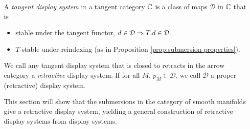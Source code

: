 \begin{definition}\label{def:display-system}
    A \emph{tangent display system} in a tangent category $\mathbb{C}$ is a class of maps $\mathcal{D}$ in $\mathbb{C}$ that is
    \begin{itemize}
        \item stable under the tangent functor, $d \in \mathcal{D} \Rightarrow T.d \in \mathcal{D}$,
        \item $T$-stable under reindexing (as in Proposition \ref{prop:submersion-properties}).
    \end{itemize}
    We call any tangent display system that is closed to retracts in the arrow category a \textit{retractive} display system. If for all $M$, $p_M \in \mathcal{D}$, we call $\mathcal{D}$ a proper (retractive) display system. 
\end{definition}
This section will show that the submersions in the category of smooth manifolds give a retractive display system, yielding a general construction of retractive display systems from display systems.


